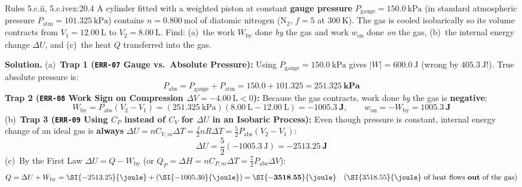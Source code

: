 \begin{workedexample}{Rules 5.c.ii, 5.c.iv}{ex:20.4}
A cylinder fitted with a weighted piston at constant \textbf{gauge pressure} $P_{\mathrm{gauge}} = \SI{150.0}{\kilo\pascal}$ (in standard atmospheric pressure $P_{\mathrm{atm}} = \SI{101.325}{\kilo\pascal}$) contains $n = \SI{0.800}{\mole}$ of diatomic nitrogen ($\mathrm{N_2}$, $f = 5$ at $\SI{300}{\kelvin}$). The gas is cooled isobarically so its volume contracts from $V_1 = \SI{12.00}{\liter}$ to $V_2 = \SI{8.00}{\liter}$. Find: (a)~the work $W_{\mathrm{by}}$ done \emph{by} the gas and work $w_{\mathrm{on}}$ done \emph{on} the gas, (b)~the internal energy change $\Delta U$, and (c)~the heat $Q$ transferred into the gas.
\par\smallskip\noindent
\textbf{Solution.}
(a)~\textbf{Trap 1 (\texttt{ERR-07} Gauge vs.\ Absolute Pressure):} Using $P_{\mathrm{gauge}} = \SI{150.0}{\kilo\pascal}$ gives $|W| = \SI{600.0}{\joule}$ (wrong by $\SI{405.3}{\joule}$!). True absolute pressure is:
$$P_{\mathrm{abs}} = P_{\mathrm{gauge}} + P_{\mathrm{atm}} = 150.0 + 101.325 = \mathbf{\SI{251.325}{\kilo\pascal}}$$
\textbf{Trap 2 (\texttt{ERR-08} Work Sign on Compression $\Delta V = \SI{-4.00}{\liter} < 0$):} Because the gas contracts, work done \emph{by} the gas is \textbf{negative}:
$$W_{\mathrm{by}} = P_{\mathrm{abs}}(V_2 - V_1) = (\SI{251.325}{\kilo\pascal})(\SI{8.00}{\liter} - \SI{12.00}{\liter}) = \mathbf{\SI{-1005.3}{\joule}}, \qquad w_{\mathrm{on}} = -W_{\mathrm{by}} = \mathbf{\SI{+1005.3}{\joule}}$$
(b)~\textbf{Trap 3 (\texttt{ERR-09} Using $C_P$ instead of $C_V$ for $\Delta U$ in an Isobaric Process):} Even though pressure is constant, internal energy change of an ideal gas is \textbf{always} $\Delta U = n C_{V,m}\Delta T = \frac{f}{2}nR\Delta T = \frac{5}{2}P_{\mathrm{abs}}(V_2 - V_1)$:
$$\Delta U = \frac{5}{2}(\SI{-1005.3}{\joule}) = \mathbf{\SI{-2513.25}{\joule}}$$
(c)~By the First Law $\Delta U = Q - W_{\mathrm{by}}$ (or $Q_P = \Delta H = n C_{P,m}\Delta T = \frac{7}{2}P_{\mathrm{abs}}\Delta V$):
$$Q = \Delta U + W_{\mathrm{by}} = \SI{-2513.25}{\joule} + (\SI{-1005.30}{\joule}) = \mathbf{\SI{-3518.55}{\joule}} \quad (\SI{3518.55}{\joule}\text{ of heat flows \textbf{out} of the gas})$$
\end{workedexample}

